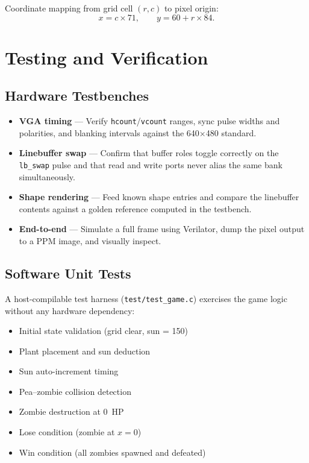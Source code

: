 \documentclass[11pt,letterpaper]{article}
\begin{document}
Coordinate mapping from grid cell $(r, c)$ to pixel origin:
\[
  x = c \times 71, \qquad y = 60 + r \times 84.
\]

\section{Testing and Verification}
\label{sec:testing}

\subsection{Hardware Testbenches}

\begin{itemize}[nosep]
  \item \textbf{VGA timing} --- Verify \texttt{hcount}/\texttt{vcount}
    ranges, sync pulse widths and polarities, and blanking intervals
    against the 640$\times$480 standard.
  \item \textbf{Linebuffer swap} --- Confirm that buffer roles toggle
    correctly on the \texttt{lb\_swap} pulse and that read and write
    ports never alias the same bank simultaneously.
  \item \textbf{Shape rendering} --- Feed known shape entries and
    compare the linebuffer contents against a golden reference computed
    in the testbench.
  \item \textbf{End-to-end} --- Simulate a full frame using Verilator,
    dump the pixel output to a PPM image, and visually inspect.
\end{itemize}

\subsection{Software Unit Tests}

A host-compilable test harness (\texttt{test/test\_game.c}) exercises
the game logic without any hardware dependency:

\begin{itemize}[nosep]
  \item Initial state validation (grid clear, sun = 150)
  \item Plant placement and sun deduction
  \item Sun auto-increment timing
  \item Pea--zombie collision detection
  \item Zombie destruction at 0~HP
  \item Lose condition (zombie at $x = 0$)
  \item Win condition (all zombies spawned and defeated)
\end{itemize}
\end{document}
